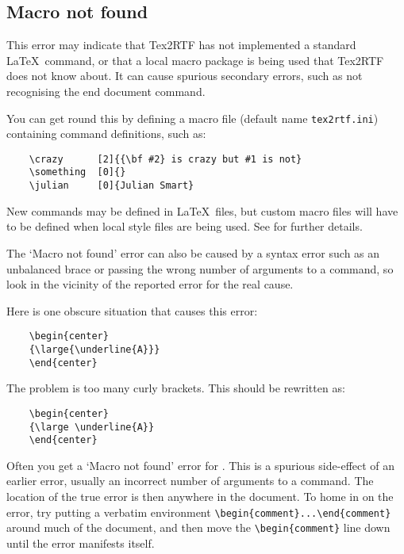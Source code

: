 \subsection{Macro not found}\label{macronotfound}%

This error may indicate that Tex2RTF has not implemented a standard
\rtfsp\LaTeX\ command, or that a local macro package is being used that
Tex2RTF does not know about. It can cause spurious secondary
errors, such as not recognising the end document command.

You can get round this by defining a macro file (default name {\tt tex2rtf.ini})
containing command definitions, such as:

\begin{verbatim}
    \crazy      [2]{{\bf #2} is crazy but #1 is not}
    \something  [0]{}
    \julian     [0]{Julian Smart}
\end{verbatim}

New commands may be defined in \LaTeX\ files, but custom macro files
will have to be defined when local style files are being used. See\rtfsp
{} for further details.

The `Macro not found' error can also be caused by a syntax error such as
an unbalanced brace or passing the wrong number of arguments to a command,
so look in the vicinity of the reported error for the real cause.

Here is one obscure situation that causes this error:

\begin{verbatim}
    \begin{center}
    {\large{\underline{A}}}
    \end{center}
\end{verbatim}

The problem is too many curly brackets. This should be rewritten as:

\begin{verbatim}
    \begin{center}
    {\large \underline{A}}
    \end{center}
\end{verbatim}

Often you get a `Macro not found' error for \verb$$. This
is a spurious side-effect of an earlier error, usually an incorrect number
of arguments to a command. The location of the true error is then anywhere
in the document. To home in on the error, try putting a verbatim environment
\rtfsp\verb$\begin{comment}...\end{comment}$ around much of the document,
and then move the \verb$\begin{comment}$ line down until the error
manifests itself.

